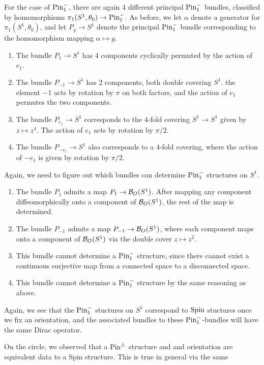 \begin{exmp}
For the case of $\mathrm{Pin}_1^-$, there are again $4$ different principal $\mathrm{Pin}_1^-$
bundles, classified by homomorphisms $\pi_1(S^1, \theta_0) \to \mathrm{Pin}_1^-$.
As before, we let $\alpha$ denote a generator for $\pi_1(S^1, \theta_0)$, and
let $P_g \to S^1$ denote the principal $\mathrm{Pin}_1^-$ bundle corresponding to
the homomorphism mapping $\alpha \mapsto g$.
%
\begin{enumerate}
  \item The bundle $P_1 \to S^1$ has $4$ components cyclically permuted
  by the action of $e_1$.
  \item The bundle $P_{-1} \to S^1$ has $2$ components, both double covering $S^1$.
  the element $-1$ acts by rotation by $\pi$ on both factors, and the action
  of $e_1$ permutes the two components.
  \item The bundle $P_{e_1} \to S^1$ corresponds to the $4$-fold covering
  $S^1 \to S^1$ given by $z \mapsto z^4$. The action of $e_1$ acts by
  rotation by $\pi / 2$.
  \item The bundle $P_{-e_1} \to S^1$ also corresponds to a $4$-fold covering,
  where the action of $-e_1$ is given by rotation by $\pi / 2$.
\end{enumerate}
%
Again, we need to figure out which bundles can determine $\mathrm{Pin}_1^-$ structures
on $S^1$.
%
\begin{enumerate}
  \item The bundle $P_1$ admits a map $P_1 \to \mathcal{B}_O(S^1)$. After mapping any
  component diffeomorphically onto a component of $\mathcal{B}_O(S^1)$, the rest of the
  map is determined.
  \item The bundle $P_{-1}$ admits a map $P_{-1} \to \mathcal{B}_O(S^1)$, where
  each component maps onto a component of $\mathcal{B}_O(S^1)$ via the double cover
  $z \mapsto z^2$.
  \item This bundle cannot determine a $\mathrm{Pin}_1^-$ structure, since there
  cannot exist a continuous surjective map from a connected space to a
  disconnected space.
  \item This bundle cannot determine a $\mathrm{Pin}_1^-$ structure by the same
  reasoning as above.
\end{enumerate}
Again, we see that the $\mathrm{Pin}_1^-$ stuctures on $S^1$ correspond to $\mathrm{Spin}$
stuctures once we fix an orientation, and the associated bundles to these
$\mathrm{Pin}_1^-$-bundles will have the same Dirac operator.
\end{exmp}
%
On the circle, we observed that a $\mathrm{Pin}^\pm$ structure and and orientation
are equivalent data to a Spin structure. This is true in general via the same
